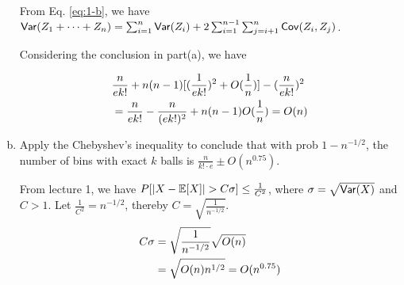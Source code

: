 \begin{problem}[20 points.]
\begin{enumerate}[(a)]
From Eq. \eqref{eq:1-b}, we have $\mathsf{Var}(Z_1 + \cdots + Z_n) = \sum_{i=1}^{n}{\mathsf{Var}(Z_i)} + 2\sum_{i=1}^{n-1}\sum_{j=i+1}^{n}{\mathsf{Cov}(Z_i, Z_j)}$.

Considering the conclusion in part(a), we have

\begin{align}
    \notag & \frac{n}{ek!} + n(n-1)[(\frac{1}{ek!})^2 + O(\frac{1}{n})] -(\frac{n}{ek!})^2 \\
    & = \frac{n}{ek!} - \frac{n}{(ek!)^2} +n(n-1)O(\frac{1}{n})= O(n)
\end{align}

\item Apply the Chebyshev's inequality to conclude that with prob $1-n^{-1/2}$, the number of bins with exact $k$ balls is $\frac{n}{k! \cdot e } ± O(n^{0.75})$.

\Answer

From lecture 1, we have $P[|X-\operatorname*{\mathbb{E}}[X]| > C\sigma] \leq \frac{1}{C^2}$, where $\sigma = \sqrt{\mathsf{Var}(X)}$ and $C > 1$. Let $\frac{1}{C^2} = n^{-1/2}$, thereby $C = \sqrt{\frac{1}{n^{-1/2}}}$.
\begin{align}
    \notag C\sigma &= \sqrt{\frac{1}{n^{-1/2}}}\sqrt{O(n)} \\
    & = \sqrt{O(n)n^{1/2}}= O(n^{0.75})
\end{align}

\end{enumerate}
\end{problem}

~\\

